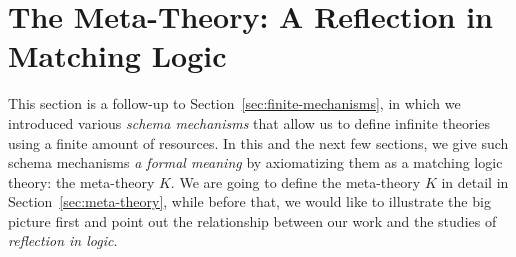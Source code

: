 \documentclass[UTF8,11pt]{article}
\theoremstyle{plain}
\theoremstyle{definition}
\theoremstyle{remark}
\begin{document}
\section{The Meta-Theory: A Reflection in Matching Logic}
\label{sec:meta-theory-reflection}

This section is a follow-up to Section~\cref{sec:finite-mechanisms}, in which 
we introduced various \emph{schema mechanisms} that allow us to define infinite 
theories using a finite amount of resources.
In this and the next few sections, we give such schema mechanisms \emph{a 
formal meaning} by axiomatizing them as a matching logic theory: the 
meta-theory $K$.
We are going to define the meta-theory $K$ in detail in 
Section~\cref{sec:meta-theory}, while before that, we would like to
illustrate the big picture first and point out the relationship between our work
and the studies of \emph{reflection in logic}.



%
%
\end{document}
